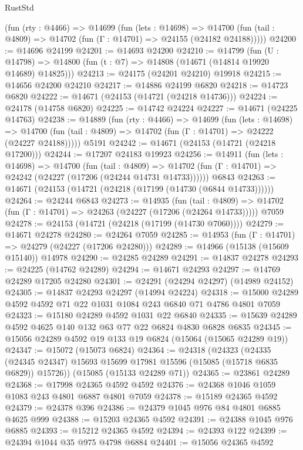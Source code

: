 \begin{lexlean}{RustStd}
\begin{coremodule}
    (fun (rty : @4466) =>
    @14699
      (fun (lets : @14698) =>
      @14700 (fun (tail : @4809) => @14702 (fun (Γ : @14701) => @24155 (@24182 @24188)))))
@24200 := @14696 @24199
@24201 := @14693 @24200
@24210 := @14799
    (fun (U : @14798) => @14800 (fun (t : @7) => @14808 (@14671 (@14814 @19920 @14689) @14825)))
@24213 := @24175 (@24201 @24210) @19918
@24215 := @14656 @24200 @24210
@24217 := @14886 @24199 @6820
@24218 := @14723 @6820
@24222 := @14671 (@24153 (@14721 (@24218 @14736)))
@24224 := @24178 (@14758 @6820)
@24225 := @14742 @24224
@24227 := @14671 (@24225 @14763)
@24238 := @14889
    (fun (rty : @4466) =>
    @14699
      (fun (lets : @14698) =>
      @14700 (fun (tail : @4809) => @14702 (fun (Γ : @14701) => @24222 (@24227 @24188)))))
    @5191
@24242 := @14671 (@24153 (@14721 (@24218 @17200)))
@24244 := @17207 @24183 @19923
@24256 := @14911
    (fun (lets : @14698) =>
    @14700
      (fun (tail : @4809) =>
      @14702 (fun (Γ : @14701) => @24242 (@24227 (@17206 (@24244 @14731 @14733))))))
    @6843
@24263 := @14671 (@24153 (@14721 (@24218 (@17199 (@14730 (@6844 @14733))))))
@24264 := @24244 @6843
@24273 := @14935
    (fun (tail : @4809) => @14702 (fun (Γ : @14701) => @24263 (@24227 (@17206 (@24264 @14733)))))
    @7059
@24278 := @24153 (@14721 (@24218 (@17199 (@14730 @7060))))
@24279 := @14671 @24278
@24280 := @24264 @7059
@24285 := @14953 (fun (Γ : @14701) => @24279 (@24227 (@17206 @24280)))
@24289 := @14966 (@15138 (@15609 @15140)) @14978
@24290 := @24285 @24289
@24291 := @14837 @24278
@24293 := @24225 (@14762 @24289)
@24294 := @14671 @24293
@24297 := @14769 @24289 @17205 @24280
@24301 := @24291 (@24294 @24297) (@14989 @24152)
@24305 := @14837 @24293 @24297 (@14994 @24224)
@24318 := @15000 @24289 @4592 @4592 @71 @22 @1031 @1084 @243 @6840 @71 @4786 @4801 @7059
@24323 := @15180 @24289 @4592 @1031 @22 @6840
@24335 := @15639 @24289 @4592 @4625 @140 @132 @63 @77 @22 @6824 @4830 @6828 @6835
@24345 := @15056 @24289 @4592 @19 @133 @19 @6824 (@15064 (@15065 @24289 @19))
@24347 := @15072 (@15073 @6824)
@24364 := @24318
    (@24323
      (@24335 (@24345 @24347) @15693 @15699 @17981 @15596 (@15085 (@15718 @6835 @6829)) @15726))
    (@15085 (@15133 @24289 @71))
@24365 := @23861 @24289
@24368 := @17998 @24365 @4592 @4592
@24376 := @24368 @1046 @1059 @1083 @243 @4801 @6887 @4801 @7059
@24378 := @15189 @24365 @4592
@24379 := @24378 @396
@24386 := @24379 @1045 @976 @84 @4801 @6885 @4625 @999
@24388 := @15203 @24365 @4592
@24391 := @24388 @1045 @976 @6885
@24393 := @15212 @24365 @4592
@24394 := @24393 @122
@24399 := @24394 @1044 @35 @975 @4798 @6884
@24401 := @15056 @24365 @4592

\end{coremodule}
\end{lexlean}
